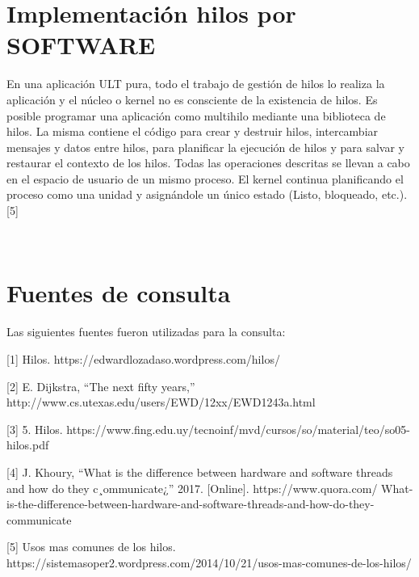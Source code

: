 \documentclass{article}
\begin{document}
\section{Implementación hilos por SOFTWARE}
En una aplicación ULT pura, todo el trabajo de gestión de hilos lo realiza la aplicación y el núcleo o kernel no es consciente de la existencia de hilos. Es posible programar una aplicación como multihilo mediante una biblioteca de hilos. La misma contiene el código para crear y destruir hilos, intercambiar mensajes y datos entre hilos, para planificar la ejecución de hilos y para salvar y restaurar el contexto de los hilos. 
Todas las operaciones descritas se llevan a cabo en el espacio de usuario de un mismo proceso. El kernel continua planificando el proceso como una unidad y asignándole un único estado (Listo, bloqueado, etc.). [5]

\\[0.5cm]




\section{Fuentes de consulta}

Las siguientes fuentes fueron utilizadas para la consulta:

[1] Hilos. https://edwardlozadaso.wordpress.com/hilos/ 

[2] E. Dijkstra, “The next fifty years,” http://www.cs.utexas.edu/users/EWD/12xx/EWD1243a.html

[3] 5. Hilos. https://www.fing.edu.uy/tecnoinf/mvd/cursos/so/material/teo/so05-hilos.pdf

[4] J. Khoury, “What is the difference between hardware and software threads
and how do they c¸ommunicate¿” 2017. [Online]. https://www.quora.com/
What-is-the-difference-between-hardware-and-software-threads-and-how-do-they-communicate

[5] Usos mas comunes de los hilos. https://sistemasoper2.wordpress.com/2014/10/21/usos-mas-comunes-de-los-hilos/
\end{document}
